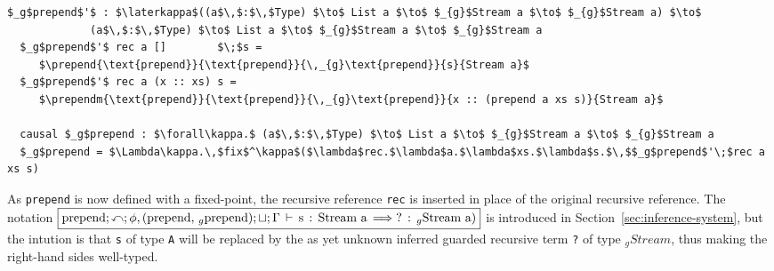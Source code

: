 \newcommand{\prepend}[5]{\ensuremath{{\boxed{#1;\causal;\phi,(#2,#3);\open;\Gamma\,\vdash\,\text{#4}\,:\,\text{#5}\,\infer
        \text{?}\,:\,_{g}\text{#5})}}}}
\newcommand{\prependm}[5]{\ensuremath{{\boxed{
            \begin{matrix*}[l] #1;\causal;\phi,(#2,#3);\open;\Gamma\,\vdash \\
                           \quad\text{#4}\,:\,\text{#5}\,\infer\,\text{?}\,:\,_{g}\text{#5})
            \end{matrix*}
            }}}}
\begin{lstlisting}[mathescape]
  $_g$prepend$'$ : $\laterkappa$((a$\,$:$\,$Type) $\to$ List a $\to$ $_{g}$Stream a $\to$ $_{g}$Stream a) $\to$ 
             (a$\,$:$\,$Type) $\to$ List a $\to$ $_{g}$Stream a $\to$ $_{g}$Stream a
  $_g$prepend$'$ rec a []        $\;$s = 
     $\prepend{\text{prepend}}{\text{prepend}}{\,_{g}\text{prepend}}{s}{Stream a}$
  $_g$prepend$'$ rec a (x :: xs) s = 
     $\prependm{\text{prepend}}{\text{prepend}}{\,_{g}\text{prepend}}{x :: (prepend a xs s)}{Stream a}$

  causal $_g$prepend : $\forall\kappa.$ (a$\,$:$\,$Type) $\to$ List a $\to$ $_{g}$Stream a $\to$ $_{g}$Stream a
  $_g$prepend = $\Lambda\kappa.\,$fix$^\kappa$($\lambda$rec.$\lambda$a.$\lambda$xs.$\lambda$s.$\,$$_g$prepend$'\;$rec a xs s)
\end{lstlisting}
As \texttt{prepend} is now defined with a fixed-point, the recursive reference
\texttt{rec} is inserted in place of the original recursive reference. The
notation \prepend{\text{prepend}}{\text{prepend}}{\,_{g}\text{prepend}}{s}{Stream a} is introduced in
Section~\ref{sec:inference-system}, but the intution is that \texttt{s} of type
\texttt{A} will be replaced by the as yet unknown inferred guarded recursive term \texttt{?} of
type $_{g}Stream$, thus making the right-hand sides well-typed.

